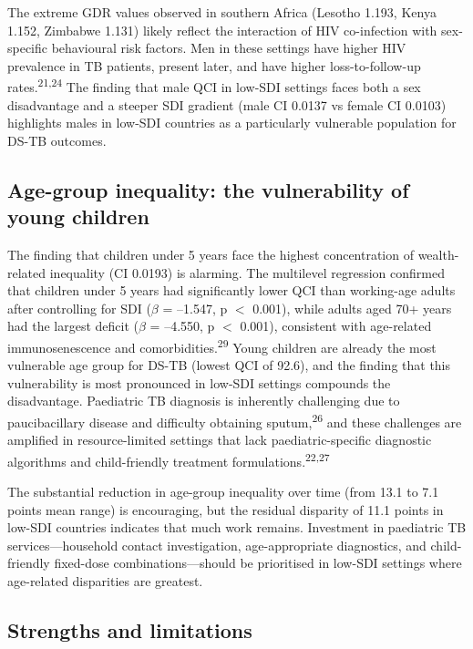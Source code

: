 \documentclass[12pt]{article}
\begin{document}
The extreme GDR values observed in southern Africa (Lesotho 1.193, Kenya 1.152, Zimbabwe 1.131) likely reflect the interaction of HIV co-infection with sex-specific behavioural risk factors. Men in these settings have higher HIV prevalence in TB patients, present later, and have higher loss-to-follow-up rates.\textsuperscript{21,24} The finding that male QCI in low-SDI settings faces both a sex disadvantage and a steeper SDI gradient (male CI 0.0137 vs female CI 0.0103) highlights males in low-SDI countries as a particularly vulnerable population for DS-TB outcomes.

\subsection{Age-group inequality: the vulnerability of young children}

The finding that children under 5 years face the highest concentration of wealth-related inequality (CI 0.0193) is alarming. The multilevel regression confirmed that children under 5 years had significantly lower QCI than working-age adults after controlling for SDI ($\beta$ = --1.547, p $<$ 0.001), while adults aged 70+ years had the largest deficit ($\beta$ = --4.550, p $<$ 0.001), consistent with age-related immunosenescence and comorbidities.\textsuperscript{29} Young children are already the most vulnerable age group for DS-TB (lowest QCI of 92.6), and the finding that this vulnerability is most pronounced in low-SDI settings compounds the disadvantage. Paediatric TB diagnosis is inherently challenging due to paucibacillary disease and difficulty obtaining sputum,\textsuperscript{26} and these challenges are amplified in resource-limited settings that lack paediatric-specific diagnostic algorithms and child-friendly treatment formulations.\textsuperscript{22,27}

The substantial reduction in age-group inequality over time (from 13.1 to 7.1 points mean range) is encouraging, but the residual disparity of 11.1 points in low-SDI countries indicates that much work remains. Investment in paediatric TB services---household contact investigation, age-appropriate diagnostics, and child-friendly fixed-dose combinations---should be prioritised in low-SDI settings where age-related disparities are greatest.

\subsection{Strengths and limitations}
\end{document}
